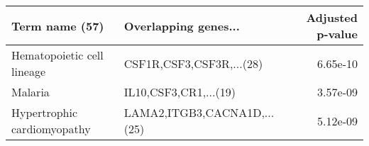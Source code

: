 \begin{tabular}{llr}
\toprule
             Term name (57) &        Overlapping genes... &  Adjusted p-value \\
\midrule
 Hematopoietic cell lineage &    CSF1R,CSF3,CSF3R,...(28) &          6.65e-10 \\
                    Malaria &       IL10,CSF3,CR1,...(19) &          3.57e-09 \\
Hypertrophic cardiomyopathy & LAMA2,ITGB3,CACNA1D,...(25) &          5.12e-09 \\
\bottomrule
\end{tabular}
